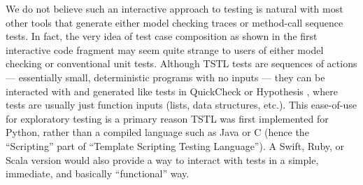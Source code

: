 We do not believe such an interactive approach to testing is natural with most other tools that generate either model checking traces or method-call sequence tests.  In fact, the very idea of test case composition as shown in the first interactive code fragment may seem quite strange to users of either model checking or conventional unit tests.  Although TSTL tests are sequences of actions --- essentially small, deterministic programs with no inputs --- they can be interacted with and generated like tests in QuickCheck \cite{ClaessenH00} or Hypothesis \cite{hypothesis}, where tests are usually just function inputs (lists, data structures, etc.). This ease-of-use for exploratory testing is a primary reason TSTL was first implemented for Python, rather than a compiled language such as Java or C (hence the ``Scripting'' part of ``Template Scripting Testing Language'').  A Swift, Ruby, or Scala version would also provide a way to interact with tests in a simple, immediate, and basically ``functional'' way.

